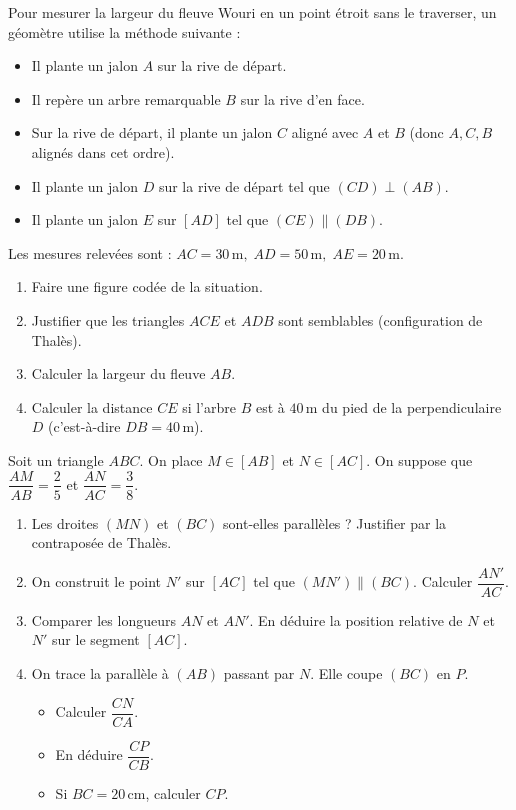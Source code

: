 \documentclass[11pt]{article}
\begin{document}
\begin{exercice}
Pour mesurer la largeur du fleuve Wouri en un point étroit sans le traverser, un géomètre utilise la méthode suivante :
\begin{itemize}
    \item Il plante un jalon $A$ sur la rive de départ.
    \item Il repère un arbre remarquable $B$ sur la rive d'en face.
    \item Sur la rive de départ, il plante un jalon $C$ aligné avec $A$ et $B$ (donc $A, C, B$ alignés dans cet ordre).
    \item Il plante un jalon $D$ sur la rive de départ tel que $(CD) \perp (AB)$.
    \item Il plante un jalon $E$ sur $[AD]$ tel que $(CE) \parallel (DB)$.
\end{itemize}
Les mesures relevées sont : $AC = 30\,\text{m},\; AD = 50\,\text{m},\; AE = 20\,\text{m}$.
\begin{enumerate}
    \item Faire une figure codée de la situation.
    \item Justifier que les triangles $ACE$ et $ADB$ sont semblables (configuration de Thalès).
    \item Calculer la largeur du fleuve $AB$.
    \item Calculer la distance $CE$ si l'arbre $B$ est à $40\,\text{m}$ du pied de la perpendiculaire $D$ (c'est-à-dire $DB = 40\,\text{m}$).
\end{enumerate}
\end{exercice}

\begin{exercice}
Soit un triangle $ABC$. On place $M \in [AB]$ et $N \in [AC]$.
On suppose que $\dfrac{AM}{AB} = \dfrac{2}{5}$ et $\dfrac{AN}{AC} = \dfrac{3}{8}$.
\begin{enumerate}
    \item Les droites $(MN)$ et $(BC)$ sont-elles parallèles ? Justifier par la contraposée de Thalès.
    \item On construit le point $N'$ sur $[AC]$ tel que $(MN') \parallel (BC)$. Calculer $\dfrac{AN'}{AC}$.
    \item Comparer les longueurs $AN$ et $AN'$. En déduire la position relative de $N$ et $N'$ sur le segment $[AC]$.
    \item On trace la parallèle à $(AB)$ passant par $N$. Elle coupe $(BC)$ en $P$.
        \begin{itemize}
            \item Calculer $\dfrac{CN}{CA}$.
            \item En déduire $\dfrac{CP}{CB}$.
            \item Si $BC = 20\,\text{cm}$, calculer $CP$.
        \end{itemize}
\end{enumerate}
\end{exercice}
\end{document}

